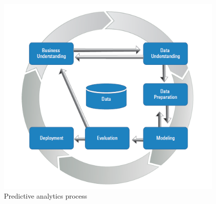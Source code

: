 \documentclass[runningheads]{llncs}
\begin{document}
\begin{figure}[htbp]
	\centering
	
	\includegraphics[scale=0.7]{Figure1.png}
	\caption{Predictive analytics process}
	\label{fig:Figure1}
\end{figure}
\newline
\end{document}
